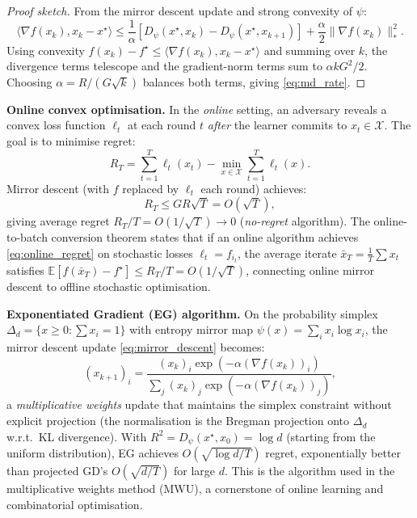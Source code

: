 \documentclass[11pt,a4paper]{article}
\theoremstyle{definition}
\begin{document}
\begin{proof}[Proof sketch]
From the mirror descent update and strong convexity of $\psi$:
\[
\langle \nabla f(x_k), x_k - x^{\star} \rangle \leq \frac{1}{\alpha}[D_\psi(x^{\star}, x_k) - D_\psi(x^{\star}, x_{k+1})] + \frac{\alpha}{2}\|\nabla f(x_k)\|_*^2.
\]
Using convexity $f(x_k) - f^{\star} \leq \langle \nabla f(x_k), x_k - x^{\star} \rangle$ and summing over $k$, the divergence terms telescope and the gradient-norm terms sum to $\alpha k G^2 / 2$. Choosing $\alpha = R/(G\sqrt{k})$ balances both terms, giving \eqref{eq:md_rate}.
\end{proof}

\noindent\textbf{Online convex optimisation.} In the \emph{online} setting, an adversary reveals a convex loss function $\ell_t$ at each round $t$ \emph{after} the learner commits to $x_t \in \mathcal{X}$. The goal is to minimise regret:
\begin{equation}
R_T = \sum_{t=1}^T \ell_t(x_t) - \min_{x \in \mathcal{X}} \sum_{t=1}^T \ell_t(x).
\end{equation}
Mirror descent (with $f$ replaced by $\ell_t$ each round) achieves:
\begin{equation}
R_T \leq G R \sqrt{T} = O(\sqrt{T}),
\label{eq:online_regret}
\end{equation}
giving average regret $R_T/T = O(1/\sqrt{T}) \to 0$ (\emph{no-regret} algorithm). The online-to-batch conversion theorem states that if an online algorithm achieves \eqref{eq:online_regret} on stochastic losses $\ell_t = f_{i_t}$, the average iterate $\bar{x}_T = \frac{1}{T}\sum x_t$ satisfies $\mathbb{E}[f(\bar{x}_T) - f^{\star}] \leq R_T/T = O(1/\sqrt{T})$, connecting online mirror descent to offline stochastic optimisation.

\noindent\textbf{Exponentiated Gradient (EG) algorithm.} On the probability simplex $\Delta_d = \{x \geq 0 : \sum x_i = 1\}$ with entropy mirror map $\psi(x) = \sum_i x_i \log x_i$, the mirror descent update \eqref{eq:mirror_descent} becomes:
\begin{equation}
(x_{k+1})_i = \frac{(x_k)_i \exp(-\alpha (\nabla f(x_k))_i)}{\sum_j (x_k)_j \exp(-\alpha (\nabla f(x_k))_j)},
\label{eq:eg}
\end{equation}
a \emph{multiplicative weights} update that maintains the simplex constraint without explicit projection (the normalisation is the Bregman projection onto $\Delta_d$ w.r.t.\ KL divergence). With $R^2 = D_\psi(x^{\star}, x_0) = \log d$ (starting from the uniform distribution), EG achieves $O(\sqrt{\log d / T})$ regret, exponentially better than projected GD's $O(\sqrt{d/T})$ for large $d$. This is the algorithm used in the multiplicative weights method (MWU), a cornerstone of online learning and combinatorial optimisation.
\end{document}
